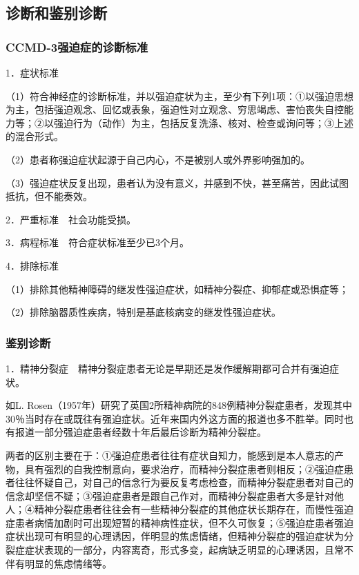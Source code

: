 \subsection{诊断和鉴别诊断}

\subsubsection{CCMD-3强迫症的诊断标准}

1．症状标准

（1）符合神经症的诊断标准，并以强迫症状为主，至少有下列1项：①以强迫思想为主，包括强迫观念、回忆或表象，强迫性对立观念、穷思竭虑、害怕丧失自控能力等；②以强迫行为（动作）为主，包括反复洗涤、核对、检查或询问等；③上述的混合形式。

（2）患者称强迫症状起源于自己内心，不是被别人或外界影响强加的。

（3）强迫症状反复出现，患者认为没有意义，并感到不快，甚至痛苦，因此试图抵抗，但不能奏效。

2．严重标准　社会功能受损。

3．病程标准　符合症状标准至少已3个月。

4．排除标准

（1）排除其他精神障碍的继发性强迫症状，如精神分裂症、抑郁症或恐惧症等；

（2）排除脑器质性疾病，特别是基底核病变的继发性强迫症状。

\subsubsection{鉴别诊断}

1．精神分裂症　精神分裂症患者无论是早期还是发作缓解期都可合并有强迫症状。

如L.
Rosen（1957年）研究了英国2所精神病院的848例精神分裂症患者，发现其中30％当时存在或既往有强迫症状。近年来国内外这方面的报道也多不胜举。同时也有报道一部分强迫症患者经数十年后最后诊断为精神分裂症。

两者的区别主要在于：①强迫症患者往往有症状自知力，能感到是本人意志的产物，具有强烈的自我控制意向，要求治疗，而精神分裂症患者则相反；②强迫症患者往往怀疑自己，对自己的信念行为要反复考虑检查，而精神分裂症患者对自己的信念却坚信不疑；③强迫症患者是跟自己作对，而精神分裂症患者大多是针对他人；④精神分裂症患者往往会有一些精神分裂症的其他症状长期存在，而慢性强迫症患者病情加剧时可出现短暂的精神病性症状，但不久可恢复；⑤强迫症患者强迫症状出现可有明显的心理诱因，伴明显的焦虑情绪，但精神分裂症的强迫症状为分裂症症状表现的一部分，内容离奇，形式多变，起病缺乏明显的心理诱因，且常不伴有明显的焦虑情绪等。

